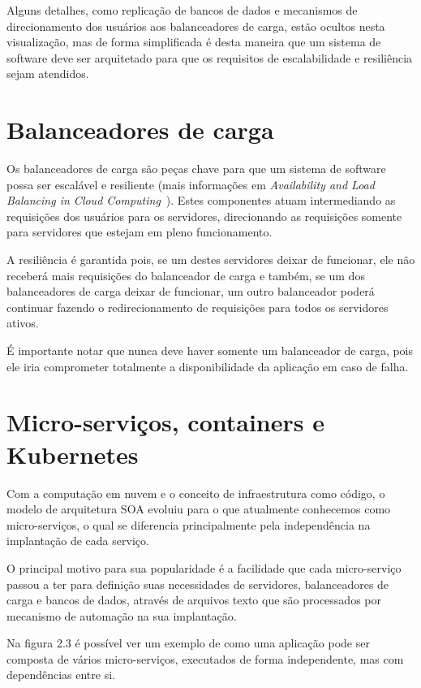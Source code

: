 Alguns detalhes, como replicação de bancos de dados e mecanismos de direcionamento
dos usuários aos balanceadores de carga, estão ocultos nesta visualização, mas de
forma simplificada é desta maneira que um sistema de software deve ser arquitetado
para que os requisitos de escalabilidade e resiliência sejam atendidos.

\section{Balanceadores de carga}
\label{sec:balanceadores-de-carga}

Os balanceadores de carga são peças chave para que um sistema de software possa ser
escalável e resiliente (mais informações em \emph{Availability and Load Balancing in Cloud Computing}~\citep{chaczko}).
Estes componentes atuam intermediando as requisições dos usuários para os servidores,
direcionando as requisições somente para servidores que estejam em pleno funcionamento.

A resiliência é garantida pois, se um destes servidores deixar de funcionar, ele não
receberá mais requisições do balanceador de carga e também, se um dos balanceadores
de carga deixar de funcionar, um outro balanceador poderá continuar fazendo o
redirecionamento de requisições para todos os servidores ativos.

É importante notar que nunca deve haver somente um balanceador de carga, pois ele
iria comprometer totalmente a disponibilidade da aplicação em caso de falha.

\section{Micro-serviços, containers e Kubernetes}
\label{sec:micro-servicos-containers-e-kubernetes}

Com a computação em nuvem e o conceito de infraestrutura como código, o modelo de
arquitetura SOA evoluiu para o que atualmente conhecemos como micro-serviços, o
qual se diferencia principalmente pela independência na implantação de cada serviço.

O principal motivo para sua popularidade é a facilidade que cada micro-serviço
passou a ter para definição suas necessidades de servidores, balanceadores de
carga e bancos de dados, através de arquivos texto que são processados por
mecanismo de automação na sua implantação.

Na figura 2.3 é possível ver um exemplo de como uma aplicação pode ser composta de
vários micro-serviços, executados de forma independente, mas com dependências
entre si.

